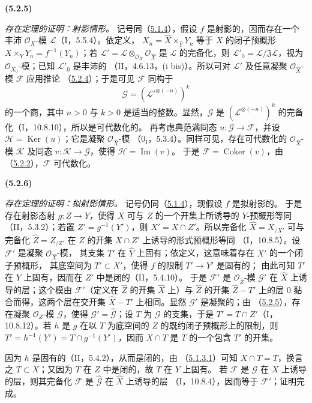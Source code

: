 \documentclass[UTF8,fontset=none,11pt,oneside,openany]{ctexbook}
\newenvironment{env}[1][]{%
  \par\medskip\noindent\textbf{(#1)}\ %
}{\par}
\newcommand{\oldpage}[2][]{%
  \hypertarget{ega-source-page-#1-#2}{}%
  \marginnote{\scriptsize\textbf{#1}~|~#2}\ignorespaces}
\let\EGAOriginalLabel\label
\renewcommand{\label}[1]{\phantomsection\EGAOriginalLabel{#1}}
\begin{document}
\begin{env}[5.2.5]
\label{III.5.2.5-fr}
\emph{存在定理的证明：射影情形。}
记号同（\hyperref[III.5.1.4-fr]{5.1.4}），假设 $f$ 是射影的，因而存在一个
丰沛 $\mathcal O_X$-模 $\mathcal L$（I，5.5.4）。依定义，
$X_n=\widehat X\times_{\widehat Y}Y_n$ 等于 $X$ 的闭子预概形
$X\times_Y Y_n=f^{-1}(Y_n)$；若
$\mathcal L'=\mathcal L\otimes_{\mathcal O_X}\mathcal O_{\widehat X}$
是 $\mathcal L$ 的完备化，则
$\mathcal L'_0=\mathcal L/\mathfrak J\mathcal L$，视为
$\mathcal O_{X_0}$-模；已知 $\mathcal L'_0$ 是丰沛的
（II，4.6.13，(i bis)）。所以可对 $\mathcal L'$ 及任意凝聚
$\mathcal O_{\widehat X}$-模 $\mathcal F$ 应用推论
（\hyperref[III.5.2.4-fr]{5.2.4}）；于是可见 $\mathcal F$ 同构于
\[
\mathcal G=(\mathcal L'^{\otimes(-n)})^k
\]
的一个商，其中 $n>0$ 与 $k>0$ 是适当的整数。显然，$\mathcal G$ 是
$(\mathcal L^{\otimes(-n)})^k$ 的完备化（I，10.8.10），所以是可代数化的。
再考虑典范满同态 $u:\mathcal G\to\mathcal F$，并设
$\mathcal H=\operatorname{Ker}(u)$；它是凝聚 $\mathcal O_{\widehat X}$-模
（$0_{\mathrm I}$，5.3.4）。同样可见，存在可代数化的
$\mathcal O_{\widehat X}$-模 $\mathcal K$ 及同态
$v:\mathcal K\to\mathcal G$，使得 $\mathcal H=\operatorname{Im}(v)$。
于是 $\mathcal F=\operatorname{Coker}(v)$，由
（\hyperref[III.5.2.2-fr]{5.2.2}），$\mathcal F$ 可代数化。
\end{env}

\begin{env}[5.2.6]
\label{III.5.2.6-fr}
\emph{存在定理的证明：拟射影情形。}
记号仍同（\hyperref[III.5.1.4-fr]{5.1.4}），现假设 $f$ 是拟射影的。
于是存在射影态射 $g:Z\to Y$，使得 $X$ 可与 $Z$ 的一个开集上所诱导的
$Y$-预概形等同（II，5.3.2）；若置 $Z'=g^{-1}(Y')$，则
$X'=X\cap Z'$。所以完备化 $\widehat X=X_{/X'}$ 可与完备化
$\widehat Z=Z_{/Z'}$ 在 $\widehat Z$ 的开集 $X\cap Z'$ 上诱导的形式预概形等同
（I，10.8.5）。设 $\mathcal F'$ 是凝聚 $\mathcal O_{\widehat X}$-模，
其支集 $T'$ 在 $\widehat Y$ 上固有；依定义，这意味着存在 $X'$ 的一个闭子预概形，
其底空间为 $T'\subset X'$，使得 $f$ 的限制 $T'\to Y'$ 是固有的；
由此可知 $T'$ 在 $Y$ 上固有，因而在 $Z'$ 中是闭的（II，5.4.10）。
于是 $\mathcal F'$ 是 $\mathcal O_{\widehat Z}$-模 $\mathcal G'$ 在
$\widehat X$ 上诱导的层；这个模由 $\mathcal F'$（定义在
$\widehat Z$ 的开集 $\widehat X$ 上）与 $\widehat Z$ 的开集
$\widehat Z-T'$ 上的层 $0$ 黏合而得，这两个层在交开集
$\widehat X-T'$ 上相同。显然 $\mathcal G'$ 是凝聚的；由
（\hyperref[III.5.2.5-fr]{5.2.5}），存在凝聚 $\mathcal O_Z$-模
$\mathcal G$，使得 $\mathcal G'=\widehat{\mathcal G}$；设 $T$ 为
$\mathcal G$ 的支集，于是 $T'=T\cap Z'$（I，10.8.12）。若 $h$ 是 $g$
在以 $T$ 为底空间的 $Z$ 的既约闭子预概形上的限制，则
$T'=h^{-1}(Y')=T\cap g^{-1}(Y')$，因而 $X\cap T$ 是 $T$ 的一个包含
$T'$ 的开集。

\oldpage[III]{154}

因为 $h$ 是固有的（II，5.4.2），从而是闭的，由
（\hyperref[III.5.1.3.1-fr]{5.1.3.1}）可知 $X\cap T=T$，换言之
$T\subset X$；又因为 $T$ 在 $Z$ 中是闭的，故 $T$ 在 $Y$ 上固有。
若 $\mathcal F$ 是 $\mathcal G$ 在 $X$ 上诱导的层，则其完备化
$\widehat{\mathcal F}$ 是 $\widehat{\mathcal G}$ 在 $\widehat X$ 上诱导的层
（I，10.8.4），因而等于 $\mathcal F'$；证明完成。
\end{env}
\end{document}
